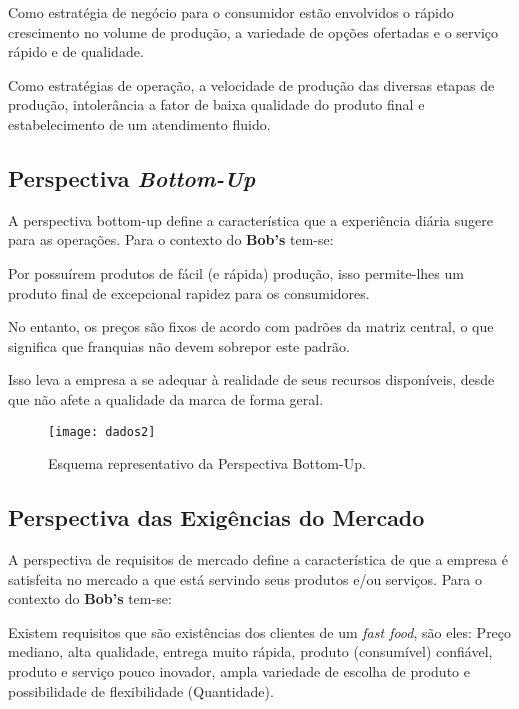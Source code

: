 			Como estratégia de negócio para o consumidor estão envolvidos o rápido crescimento no volume de produção, a variedade de opções ofertadas e o serviço rápido e de qualidade.

			Como estratégias de operação, a velocidade de produção das diversas etapas de produção, intolerância a fator de baixa qualidade do produto final e estabelecimento de um atendimento fluido.

		\subsection[Perspectiva Bottom-Up]{Perspectiva \emph{Bottom-Up}}
		\label{sec:dados_perspSul}

			A perspectiva bottom-up define a característica que a experiência diária sugere para as operações. Para o contexto do \textbf{Bob’s} tem-se:

			Por possuírem produtos de fácil (e rápida) produção, isso permite-lhes um produto final de excepcional rapidez para os consumidores. 

			No entanto, os preços são fixos de acordo com padrões da matriz central, o que significa que franquias não devem sobrepor este padrão.

			Isso leva a empresa a se adequar à realidade de seus recursos disponíveis, desde que não afete a qualidade da marca de forma geral.

			\begin{figure}[h]
				\centering
				\texttt{[image: dados2]}
				\caption[Esquema representativo da Perspectiva Bottom-Up]{Esquema representativo da Perspectiva Bottom-Up. \cite{slack}}
				\label{fig:dados2}
			\end{figure}

		\subsection[Perspectiva das Exigências do Mercado]{Perspectiva das Exigências do Mercado}
		\label{sec:dados_perspLeste}
			
			A perspectiva de requisitos de mercado define a característica de que a empresa é satisfeita no mercado a que está servindo seus produtos e/ou serviços. Para o contexto do \textbf{Bob’s} tem-se:

			Existem requisitos que são existências dos clientes de um \emph{fast food}, são eles: Preço mediano, alta qualidade, entrega muito rápida, produto (consumível) confiável, produto e serviço pouco inovador, ampla variedade de escolha de produto e possibilidade de flexibilidade (Quantidade).

